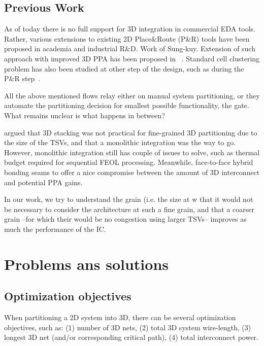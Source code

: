 \documentclass[conference]{IEEEtran}
\begin{document}
\subsection{Previous Work}
As of today there is no full support for 3D integration in commercial EDA tools. Rather, various extensions to existing 2D Place\&Route (P\&R) tools have been proposed in academia and industrial R\&D. Work of Sung-kuy. Extension of such approach with improved 3D PPA has been proposed in ~\cite{Chang2016}. %
Standard cell clustering problem has also been studied at other step of the design, such as during the P\&R step~\cite{Moura2017}. %

All the above mentioned flows relay either on manual system partitioning, or they automate the partitioning decision for smallest possible functionality, the gate. What remains unclear is what happens in between?  

\cite{Samal2017} argued that 3D stacking was not practical for fine-grained 3D partitioning due to the size of the TSVs, and that a monolithic integration was the way to go. However, monolithic integration still has couple of issues to solve, such as thermal budget required for sequential FEOL processing. Meanwhile, face-to-face hybrid bonding seams to offer a nice compromise between the amount of 3D interconnect and potential PPA gains.

In our work, we try to understand the grain (i.e. the size at w that it would not be necessary to consider the architecture at such a fine grain, and that a coarser grain --for which their would be no congestion using larger TSVs-- improves as much the performance of the IC.

\section{Problems ans solutions}
\subsection{Optimization objectives}
When partitioning a 2D system into 3D, there can be several optimization objectives, such as: (1) number of 3D nets, (2) total 3D system wire-length, (3) longest 3D net (and/or corresponding critical path), (4) total interconnect power.
\end{document}
